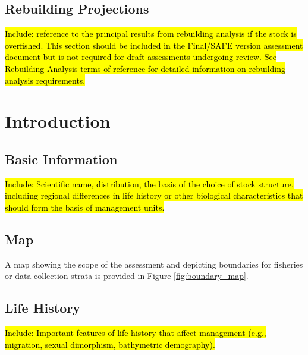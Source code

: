 \documentclass[12pt,]{article}
\begin{document}
\subsection*{Rebuilding Projections}\label{rebuilding-projections}

\hl{Include: reference to the principal results from rebuilding analysis if the 
stock is overfished. This section should be included in the Final/SAFE version 
assessment document but is not required for draft assessments undergoing review. 
See Rebuilding Analysis terms of reference for detailed information on 
rebuilding analysis requirements.}

\FloatBarrier

\newpage

\renewcommand{\thefigure}{\arabic{figure}}
\renewcommand{\thetable}{\arabic{table}}

\setcounter{figure}{0} \setcounter{table}{0}

\section{Introduction}\label{introduction}

\subsection{Basic Information}\label{basic-information}

\hl{Include: Scientific name, distribution, the basis of the choice of stock structure, 
including regional differences in life history or other biological characteristics 
that should form the basis of management units.}

\subsection{Map}\label{map}

A map showing the scope of the assessment and depicting boundaries for
fisheries or data collection strata is provided in Figure
\ref{fig:boundary_map}.

\subsection{Life History}\label{life-history}

\hl{Include: Important features of life history that affect management (e.g., migration, 
sexual dimorphism, bathymetric demography).}
\end{document}
